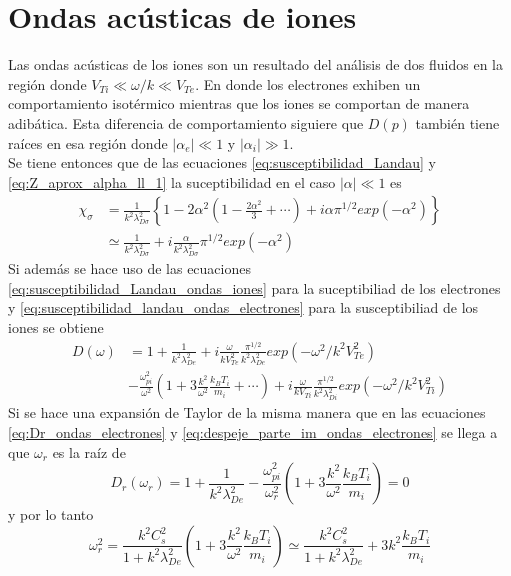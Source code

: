 \documentclass[../tesis_main_file.tex]{subfile}
\begin{document}
\section{Ondas acústicas de iones}
Las ondas acústicas de los iones son un resultado del análisis de dos fluidos en la región donde $V_{Ti} \ll \omega /k \ll V_{Te}$. En donde los electrones exhiben un comportamiento isotérmico mientras que los iones se comportan de manera adibática.
Esta diferencia de comportamiento siguiere que $D(p)$ también tiene raíces en esa región donde $|\alpha _e|\ll 1$ y $|\alpha _i|\gg 1$.\\
Se tiene entonces que de las ecuaciones \ref{eq:susceptibilidad_Landau} y \ref{eq:Z_aprox_alpha_ll_1} la suceptibilidad en el caso $|\alpha | \ll 1$ es
\begin{equation}
\label{eq:susceptibilidad_Landau_ondas_iones}
\begin{split}
\chi _{\sigma} &= \frac{1}{k^2\lambda^2_{D\sigma}}\left\lbrace 1-2\alpha^2 \left(1-\frac{2\alpha^2}{3}+\cdots \right) + i\alpha \pi^{1/2}exp(-\alpha^2)\right\rbrace \\
&\simeq \frac{1}{k^2\lambda^2_{D\sigma}}+i\frac{\alpha}{k^2\lambda^2_{D\sigma}}\pi^{1/2}exp(-\alpha^2)
\end{split}
\end{equation}
Si además se hace uso de las ecuaciones \ref{eq:susceptibilidad_Landau_ondas_iones} para la suceptibiliad de los electrones y \ref{eq:susceptibilidad_landau_ondas_electrones} para la susceptibiliad de los iones se obtiene
\begin{equation}
\begin{split}
D(\omega) &= 1+\frac{1}{k^2 \lambda^2_{De}}+i\frac{\omega}{kV^2_{Te}}\frac{\pi^{1/2}}{k^2\lambda^2_{De}}exp(-\omega^2/k^2V^2_{Te})\\
&-\frac{\omega^2_{pi}}{\omega^2}\left(1+3\frac{k^2}{\omega^2}\frac{k_BT_i}{m_i}+\cdots \right)+i\frac{\omega}{kV_{Ti}}\frac{\pi^{1/2}}{k^2\lambda^2_{Di}}exp(-\omega^2/k^2V^2_{Ti})
\end{split}
\end{equation}
Si se hace una expansión de Taylor de la misma manera que en las ecuaciones \ref{eq:Dr_ondas_electrones} y \ref{eq:despeje_parte_im_ondas_electrones} se llega a que $\omega_r$ es la raíz de 
\begin{equation}
D_r(\omega_r)=1+\frac{1}{k^2\lambda^2_{De}}-\frac{\omega^2_{pi}}{\omega^2_r}\left(1+3\frac{k^2}{\omega^2}\frac{k_BT_i}{m_i}\right)=0
\end{equation}
y por lo tanto
\begin{equation}
\omega^2_r =\frac{k^2 C^2_s}{1+k^2\lambda^2_{De}}\left(1+3\frac{k^2}{\omega^2}\frac{k_BT_i}{m_i}\right)\simeq\frac{k^2C^2_s}{1+k^2\lambda^2_{De}}+3k^2\frac{k_BT_i}{m_i}
\end{equation}
\end{document}
